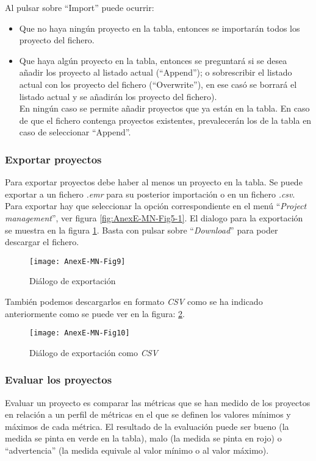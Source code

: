 Al pulsar sobre ``Import'' puede ocurrir:
\begin{itemize}
	\item Que no haya ningún proyecto en la tabla, entonces se importarán todos los proyecto del fichero.
	\item Que haya algún proyecto en la tabla, entonces se preguntará si se desea añadir los proyecto al listado actual (``Append''); o sobrescribir el listado actual con los proyecto del fichero (``Overwrite''), en ese casó se borrará el listado actual y se añadirán los proyecto del fichero).\\
	En ningún caso se permite añadir proyectos que ya están en la tabla. En caso de que el fichero contenga proyectos existentes, prevalecerán los de la tabla en caso de seleccionar ``Append''.
\end{itemize}


\subsubsection{Exportar proyectos}
Para exportar proyectos debe haber al menos un proyecto en la tabla.
Se puede exportar a un fichero \textit{.emr} para su posterior importación o en un fichero \textit{.csv}. Para exportar hay que seleccionar la opción correspondiente en el menú ``\textit{Project management}'', ver figura \ref{fig:AnexE-MN-Fig5-1}. El dialogo para la exportación se muestra en la figura \ref{fig:AnexE-MN-Fig9}. Basta con pulsar sobre ``\textit{Download}'' para poder descargar el fichero.
\begin{figure}[!h]
	\centering
	\texttt{[image: AnexE-MN-Fig9]}
	\caption{Diálogo de exportación}\label{fig:AnexE-MN-Fig9}
\end{figure}
\FloatBarrier

También podemos descargarlos en formato \textit{CSV} como se ha indicado anteriormente como se puede ver en la figura: \ref{fig:AnexE-MN-Fig10}.
\begin{figure}[!h]
	\centering
	\texttt{[image: AnexE-MN-Fig10]}
	\caption{Diálogo de exportación como \textit{CSV}}\label{fig:AnexE-MN-Fig10}
\end{figure}
\FloatBarrier


\subsubsection{Evaluar los proyectos}
Evaluar un proyecto es comparar las métricas que se han medido de los proyectos en relación a un perfil de métricas en el que se definen los valores mínimos y máximos de cada métrica. El resultado de la evaluación puede ser bueno (la medida se pinta en verde en la tabla), malo (la medida se pinta en rojo) o ``advertencia'' (la medida equivale al valor mínimo o al valor máximo).

